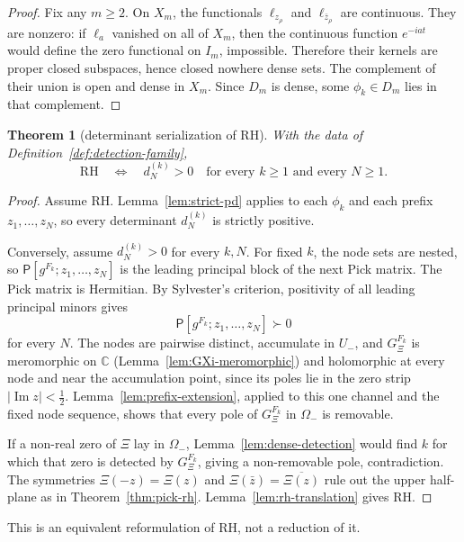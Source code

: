 \documentclass[11pt]{amsart}
\newtheorem{theorem}{Theorem}[section]
\theoremstyle{definition}
\theoremstyle{remark}
\theoremstyle{definition}
\renewcommand{\Im}{\operatorname{Im}}
\newcommand{\half}{\tfrac{1}{2}}
\newcommand{\C}{\mathbb{C}}
\newcommand{\GXi}{G_\Xi}
\begin{document}
\begin{proof}
Fix any $m\ge2$.  On $X_m$, the functionals $\ell_{z_\rho}$ and $\ell_{\bar z_\rho}$ are continuous.
They are nonzero: if $\ell_a$ vanished on all of $X_m$, then the continuous function $e^{-iat}$ would
define the zero functional on $I_m$, impossible.  Therefore their kernels are proper closed subspaces,
hence closed nowhere dense sets.  The complement of their union is open and dense in $X_m$.  Since
$D_m$ is dense, some $\phi_k\in D_m$ lies in that complement.
\end{proof}

\begin{theorem}[determinant serialization of RH]\label{thm:det-serialization}
With the data of Definition~\ref{def:detection-family},
\[
   \mathrm{RH}
   \quad\Longleftrightarrow\quad
   d_N^{(k)}>0\quad\text{for every }k\ge1\text{ and every }N\ge1.
\]
\end{theorem}

\begin{proof}
Assume RH.  Lemma~\ref{lem:strict-pd} applies to each $\phi_k$ and each prefix
$z_1,\ldots,z_N$, so every determinant $d_N^{(k)}$ is strictly positive.

Conversely, assume $d_N^{(k)}>0$ for every $k,N$.  For fixed $k$, the node sets are nested, so
$\mathsf P[g^{F_k};z_1,\ldots,z_N]$ is the leading principal block of the next Pick matrix.  The Pick
matrix is Hermitian.  By Sylvester's criterion, positivity of all leading principal minors gives
\[
   \mathsf P[g^{F_k};z_1,\ldots,z_N]\succ0
\]
for every $N$.  The nodes are pairwise distinct, accumulate in $U_-$, and $\GXi^{F_k}$ is meromorphic on
$\C$ (Lemma~\ref{lem:GXi-meromorphic}) and holomorphic at every node and near the accumulation point,
since its poles lie in the zero strip $|\Im z|<\half$.  Lemma~\ref{lem:prefix-extension}, applied to this
one channel and the fixed node sequence, shows that every
pole of $\GXi^{F_k}$ in $\Omega_-$ is removable.

If a non-real zero of $\Xi$ lay in $\Omega_-$, Lemma~\ref{lem:dense-detection} would find $k$ for which
that zero is detected by $\GXi^{F_k}$, giving a non-removable pole, contradiction.  The symmetries
$\Xi(-z)=\Xi(z)$ and $\Xi(\bar z)=\overline{\Xi(z)}$ rule out the upper half-plane as in
Theorem~\ref{thm:pick-rh}.  Lemma~\ref{lem:rh-translation} gives RH.
\end{proof}

This is an equivalent reformulation of RH, not a reduction of it.
\end{document}
